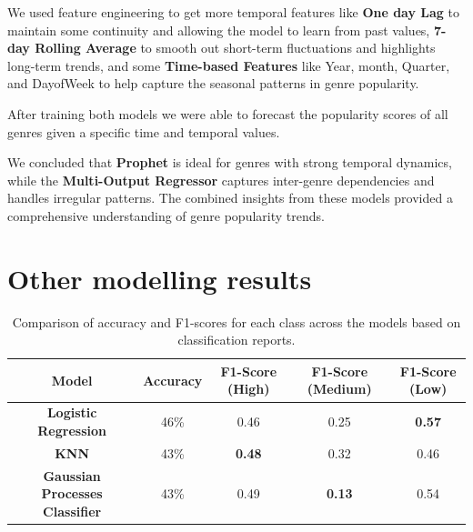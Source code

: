 \documentclass{article}
\begin{document}
We used feature engineering to get more temporal features like \textbf{One day Lag} to maintain some continuity and allowing the model to learn from past values, \textbf{7-day Rolling Average} to smooth out short-term fluctuations and highlights long-term trends, and some \textbf{Time-based Features} like Year, month, Quarter, and DayofWeek to help capture the seasonal patterns in genre popularity.

After training both models we were able to forecast the popularity scores of all genres given a specific time and temporal values.

We concluded that \textbf{Prophet} is ideal for genres with strong temporal dynamics, while the \textbf{Multi-Output Regressor} captures inter-genre dependencies and handles irregular patterns. The combined insights from these models provided a comprehensive understanding of genre popularity trends.

\section{Other modelling results}
\label{appendix:other_modelling_results}

\begin{table}[h]
\centering
\begin{tabular}{|c|c|c|c|c|}
\hline
\textbf{Model}      & \textbf{Accuracy} & \textbf{F1-Score (High)} & \textbf{F1-Score (Medium)} & \textbf{F1-Score (Low)} \\ \hline
\textbf{Logistic Regression} & 46\%           & 0.46                     & 0.25                       & \textbf{0.57}          \\ \hline
\textbf{KNN}        & 43\%              & \textbf{0.48}            & 0.32                       & 0.46                   \\ \hline
\textbf{Gaussian Processes Classifier}        & 43\%              & 0.49                     & \textbf{0.13}              & 0.54                   \\ \hline
\end{tabular}
\caption{Comparison of accuracy and F1-scores for each class across the models based on classification reports.}
\label{tab:f1_class_comparison}
\end{table}
\end{document}
